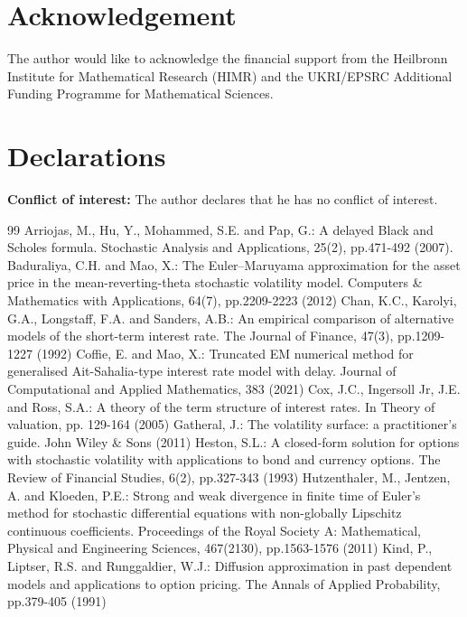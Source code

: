 \documentclass[11pt]{article}
\begin{document}
\section*{Acknowledgement}
The author would like to acknowledge the financial support from the Heilbronn Institute for Mathematical Research (HIMR) and the UKRI/EPSRC Additional Funding Programme for Mathematical Sciences. 

\section*{Declarations}
\textbf{Conflict of interest:} The author declares that he has no conflict of interest.


\begin{thebibliography}{99}
Arriojas, M., Hu, Y., Mohammed, S.E. and Pap, G.: A delayed Black and Scholes formula. Stochastic Analysis and Applications, 25(2), pp.471-492 (2007).
Baduraliya, C.H. and Mao, X.: The Euler–Maruyama approximation for the asset price in the mean-reverting-theta stochastic volatility model. Computers \& Mathematics with Applications, 64(7), pp.2209-2223 (2012)
Chan, K.C., Karolyi, G.A., Longstaff, F.A. and Sanders, A.B.: An empirical comparison of alternative models of the short-term interest rate. The Journal of Finance, 47(3), pp.1209-1227 (1992)
Coffie, E. and Mao, X.: Truncated EM numerical method for generalised Ait-Sahalia-type interest rate model with delay. Journal of Computational and Applied Mathematics, 383 (2021)
Cox, J.C., Ingersoll Jr, J.E. and Ross, S.A.: A theory of the term structure of interest rates. In Theory of valuation, pp. 129-164 (2005)
Gatheral, J.: The volatility surface: a practitioner's guide. John Wiley \& Sons (2011)
Heston, S.L.: A closed-form solution for options with stochastic volatility with applications to bond and currency options. The Review of Financial Studies, 6(2), pp.327-343 (1993)
Hutzenthaler, M., Jentzen, A. and Kloeden, P.E.: Strong and weak divergence in finite time of Euler's method for stochastic differential equations with non-globally Lipschitz continuous coefficients. Proceedings of the Royal Society A: Mathematical, Physical and Engineering Sciences, 467(2130), pp.1563-1576 (2011)
Kind, P., Liptser, R.S. and Runggaldier, W.J.: Diffusion approximation in past dependent models and applications to option pricing. The Annals of Applied Probability, pp.379-405 (1991)

\end{thebibliography}
\end{document}
